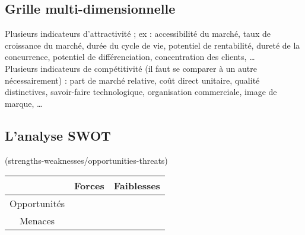 			
		\subsection{Grille multi-dimensionnelle}
	
	
		Plusieurs indicateurs d'attractivité ; ex : accessibilité du marché, taux de croissance du marché, durée du cycle de vie, potentiel de rentabilité, dureté de la concurrence, potentiel de différenciation, concentration des clients, \dots \\
		
		Plusieurs indicateurs de compétitivité (il faut se comparer à un autre nécessairement) : part de marché relative, coût direct unitaire, qualité distinctives, savoir-faire technologique, organisation commerciale, image de marque, \dots \\

\begin{comment}
		Conseils pour kiwi :
	
		\begin{itemize}
			\item tous les produits d'un marché (ou plus) sur une période
			\item pivot attractivité
			\item tous les produits d'un même segment ont la même attractivité
			\item CLPD = leader ou challenger	
			\item un seul à gauche : le leader ( = 4)
			\item surface = profit ou CA
			\item une couleur par concurrent
			\item prudence yo-yo et proximité des axes
			\item comparaison avec multi-critères : tous les produits
		\end{itemize}
\end{comment}
	
		\subsection{L'analyse SWOT}
	
		(strengths-weaknesses/opportunities-threats)
		
		\begin{center}
		\begin{tabular}{|c|c|c|}
			\hline  & Forces & Faiblesses \\ 
			\hline Opportunités &  &  \\ 
			\hline Menaces &  &  \\ 
			\hline 
		\end{tabular} 
		\end{center}
	
